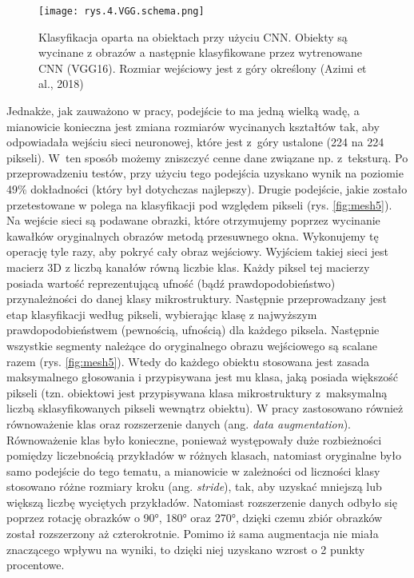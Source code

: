 \begin{figure}[h]
    \centering
    \texttt{[image: rys.4.VGG.schema.png]}
    \caption{Klasyfikacja oparta na obiektach przy użyciu CNN. Obiekty są wycinane z obrazów a następnie klasyfikowane przez wytrenowane CNN (VGG16). Rozmiar wejściowy jest z góry określony (Azimi et al., 2018)}
    \label{fig:mesh4}
\end{figure}

\noindent Jednakże, jak zauważono w pracy, podejście to ma jedną wielką wadę, a mianowicie konieczna jest zmiana rozmiarów wycinanych kształtów tak, aby odpowiadała wejściu sieci neuronowej, które jest z~góry ustalone (224 na 224 pikseli). W~ten sposób możemy zniszczyć cenne dane związane np. z~teksturą. Po przeprowadzeniu testów, przy użyciu tego podejścia uzyskano wynik na poziomie 49\% dokładności (który był dotychczas najlepszy). Drugie podejście, jakie zostało przetestowane w \cite{Azimi18} polega na klasyfikacji pod względem pikseli (rys. \ref{fig:mesh5}). Na wejście sieci są podawane obrazki, które otrzymujemy poprzez wycinanie kawałków oryginalnych obrazów metodą przesuwnego okna. Wykonujemy tę operację tyle razy, aby pokryć cały obraz wejściowy. Wyjściem takiej sieci jest macierz 3D z liczbą kanałów równą liczbie klas. Każdy piksel tej macierzy posiada wartość reprezentującą ufność (bądź prawdopodobieństwo) przynależności do danej klasy mikrostruktury. Następnie przeprowadzany jest etap klasyfikacji według pikseli, wybierając klasę z najwyższym prawdopodobieństwem (pewnością, ufnością) dla każdego piksela. Następnie wszystkie segmenty należące do oryginalnego obrazu wejściowego są scalane razem (rys. \ref{fig:mesh5}). Wtedy do każdego obiektu stosowana jest zasada maksymalnego głosowania i przypisywana jest mu klasa, jaką posiada większość pikseli (tzn. obiektowi jest przypisywana klasa mikrostruktury z~maksymalną liczbą sklasyfikowanych pikseli wewnątrz obiektu). W pracy zastosowano również równoważenie klas oraz rozszerzenie danych (ang. \textit{data augmentation}). Równoważenie klas było konieczne, ponieważ występowały duże rozbieżności pomiędzy liczebnością przykładów w różnych klasach, natomiast oryginalne było samo podejście do tego tematu, a mianowicie w zależności od liczności klasy stosowano różne rozmiary kroku (ang. \textit{stride}), tak, aby uzyskać mniejszą lub większą liczbę wyciętych przykładów. Natomiast rozszerzenie danych odbyło się poprzez rotację obrazków o 90°, 180° oraz 270°, dzięki czemu zbiór obrazków został rozszerzony aż czterokrotnie. Pomimo iż sama augmentacja nie miała znaczącego wpływu na wyniki, to dzięki niej uzyskano wzrost o 2 punkty procentowe.
